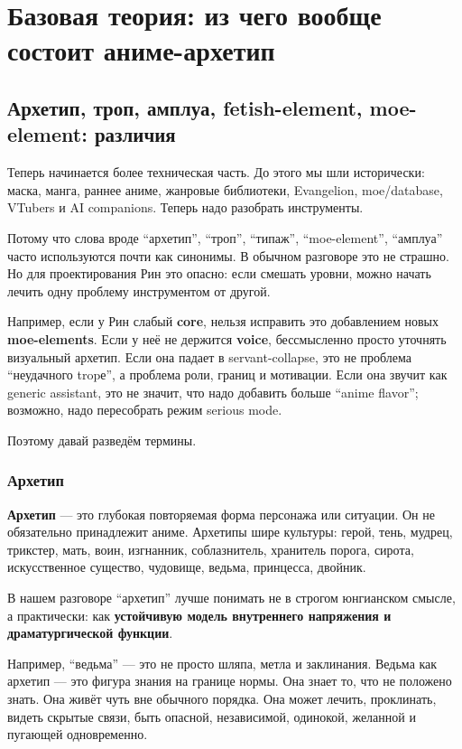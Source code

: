 \setcounter{chapter}{1}
\chapter{Базовая теория: из чего вообще состоит аниме-архетип}

\setcounter{section}{0}
\section{Архетип, троп, амплуа, fetish-element, moe-element: различия}

Теперь начинается более техническая часть. До этого мы шли исторически:
маска, манга, раннее аниме, жанровые библиотеки, Evangelion,
moe/\hspace{0pt}database, VTubers и AI companions. Теперь надо разобрать
инструменты.

Потому что слова вроде ``архетип'', ``троп'', ``типаж'',
``moe-element'', ``амплуа'' часто используются почти как синонимы. В
обычном разговоре это не страшно. Но для проектирования Рин это опасно:
если смешать уровни, можно начать лечить одну проблему инструментом от
другой.

Например, если у Рин слабый \textbf{core}, нельзя исправить это
добавлением новых \textbf{moe-elements}. Если у неё не держится
\textbf{voice}, бессмысленно просто уточнять визуальный архетип. Если
она падает в servant-collapse, это не проблема ``неудачного tropе'', а
проблема роли, границ и мотивации. Если она звучит как generic
assistant, это не значит, что надо добавить больше ``anime flavor'';
возможно, надо пересобрать режим serious mode.

Поэтому давай разведём термины.

\subsection*{Архетип}

\textbf{Архетип} --- это глубокая повторяемая форма персонажа или
ситуации. Он не обязательно принадлежит аниме. Архетипы шире культуры:
герой, тень, мудрец, трикстер, мать, воин, изгнанник, соблазнитель,
хранитель порога, сирота, искусственное существо, чудовище, ведьма,
принцесса, двойник.

В нашем разговоре ``архетип'' лучше понимать не в строгом юнгианском
смысле, а практически: как \textbf{устойчивую модель внутреннего
напряжения и драматургической функции}.

Например, ``ведьма'' --- это не просто шляпа, метла и заклинания. Ведьма
как архетип --- это фигура знания на границе нормы. Она знает то, что не
положено знать. Она живёт чуть вне обычного порядка. Она может лечить,
проклинать, видеть скрытые связи, быть опасной, независимой, одинокой,
желанной и пугающей одновременно.

